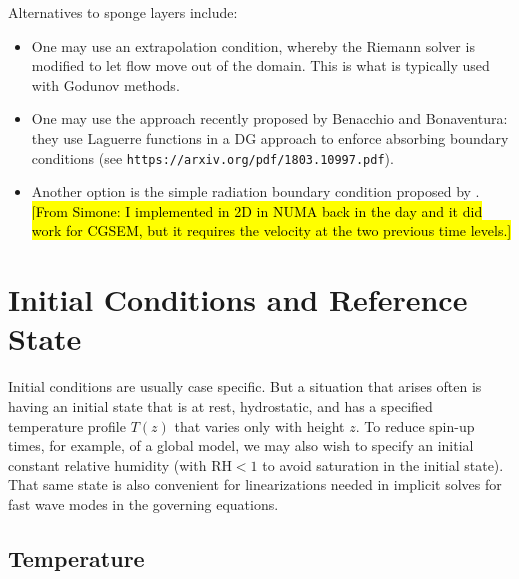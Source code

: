 \documentclass{report}
\begin{document}
Alternatives to sponge layers include:
\begin{itemize}
    \item One may use an extrapolation condition, whereby the Riemann solver is modified to let flow move out of the domain. This is what is typically used with Godunov methods. 
    \item One may use the approach recently proposed by Benacchio and Bonaventura: they use Laguerre functions in a DG approach to enforce absorbing boundary conditions (see \texttt{https://arxiv.org/pdf/1803.10997.pdf}).
    \item Another option is the simple radiation boundary condition proposed by \cite{orlanski1979}. \hl{[From Simone: I implemented in 2D in NUMA back in the day and it did work for CGSEM, but it requires the velocity at the two previous time levels.]}
\end{itemize}
    
\chapter{Initial Conditions and Reference State}\label{s:initial_conditions}

Initial conditions are usually case specific. But a situation that arises often is having an initial state that is at rest, hydrostatic, and has a specified temperature profile $T(z)$ that varies only with height $z$. To reduce spin-up times, for example, of a global model, we may also wish to specify an initial constant relative humidity (with $\mathrm{RH} < 1$ to avoid saturation in the initial state). That same state is also convenient for linearizations needed in implicit solves for fast wave modes in the governing equations.

\section{Temperature}
\end{document}
